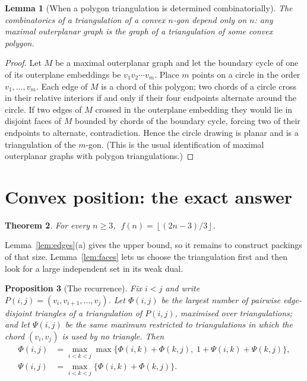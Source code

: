 \documentclass[11pt]{article}
\theoremstyle{plain}
\newtheorem{theorem}{Theorem}[section]
\newtheorem{lemma}[theorem]{Lemma}
\newtheorem{proposition}[theorem]{Proposition}
\theoremstyle{definition}
\theoremstyle{remark}
\newcommand{\Floor}[1]{\left\lfloor #1\right\rfloor}
\begin{document}
\begin{lemma}[When a polygon triangulation is determined combinatorially]\label{lem:poly}
The combinatorics of a triangulation of a convex $n$-gon depend only on $n$: any maximal
outerplanar graph is the graph of a triangulation of some convex polygon.
\end{lemma}

\begin{proof}
Let $M$ be a maximal outerplanar graph and let the boundary cycle of one of its outerplane
embeddings be $v_1v_2\cdots v_m$.  Place $m$ points on a circle in the order
$v_1,\dots,v_m$.  Each edge of $M$ is a chord of this polygon; two chords of a circle cross
in their relative interiors if and only if their four endpoints alternate around the circle.
If two edges of $M$ crossed in the outerplane embedding they would lie in disjoint faces of
$M$ bounded by chords of the boundary cycle, forcing two of their endpoints to alternate,
contradiction.  Hence the circle drawing is planar and is a triangulation of the
$m$-gon.  (This is the usual identification of maximal outerplanar graphs with polygon
triangulations.)
\end{proof}

\section{Convex position: the exact answer}

\begin{theorem}\label{thm:f}
For every $n\ge 3$, $\;f(n)=\Floor{(2n-3)/3}$.
\end{theorem}

Lemma~\ref{lem:edges}(a) gives the upper bound, so it remains to construct packings of that
size.  Lemma~\ref{lem:faces} lets us choose the triangulation first and then look for a
large independent set in its weak dual.

\begin{proposition}[The recurrence]\label{prop:rec}
Fix $i<j$ and write $P(i,j)=(v_i,v_{i+1},\dots,v_j)$.  Let $\Phi(i,j)$ be the largest
number of pairwise edge-disjoint triangles of a triangulation of $P(i,j)$, maximised over
triangulations; and let $\Psi(i,j)$ be the same maximum restricted to triangulations in
which the chord $(v_i,v_j)$ is used by no triangle.  Then
\begin{align}
\Phi(i,j)&=\max_{i<k<j}\max\bigl\{\Phi(i,k)+\Phi(k,j),\;1+\Psi(i,k)+\Psi(k,j)\bigr\},
\label{eq:rec}\\
\Psi(i,j)&=\max_{i<k<j}\bigl\{\Phi(i,k)+\Phi(k,j)\bigr\}.
\label{eq:rec1b}
\end{align}
\end{proposition}
\end{document}
